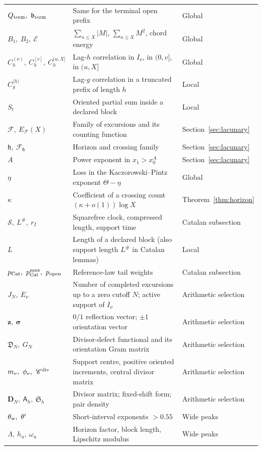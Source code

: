 \documentclass[11pt,reqno]{amsart}
\numberwithin{equation}{section}
\theoremstyle{plain}
\theoremstyle{definition}
\theoremstyle{remark}
\newcommand{\Sq}{\mathcal{S}}
\newcommand{\En}{\mathcal{E}}
\newcommand{\F}{\mathcal{F}}
\begin{document}
\begin{longtable}{@{}p{}p{}p{}@{}}
$Q_{\rm term},\ \mathfrak b_{\rm term}$ & Same for the terminal open prefix & Global\\
$B_1,\ B_2,\ \En$ & $\sum_{n\le X}|M|$, $\sum_{n\le X}M^2$, chord energy & Global\\
$C_h^{(\nu)},\ C_h^{[v]},\ C_h^{(u,X]}$ & Lag-$h$ correlation in $I_\nu$, in $(0,v]$, in $(u,X]$ & Global\\
$C_g^{\langle h\rangle}$ & Lag-$g$ correlation in a truncated prefix of length $h$ & Local\\
$S_t$ & Oriented partial sum inside a declared block & Local\\
$\F,\ E_\F(X)$ & Family of excursions and its counting function & Section~\ref{sec:lacunary}\\
$\mathfrak h,\ \F_{\mathfrak h}$ & Horizon and crossing family & Section~\ref{sec:lacunary}\\
$A$ & Power exponent in $x_1>x_0^A$ & Section~\ref{sec:lacunary}\\
$\eta$ & Loss in the Kaczorowski--Pintz exponent $\Theta-\eta$ & Global\\
$\kappa$ & Coefficient of a crossing count $(\kappa+o(1))\log X$ & Theorem~\ref{thm:horizon}\\
$\Sq,\ L^\#,\ r_I$ & Squarefree clock, compressed length, support time & Catalan subsection\\
$L$ & Length of a declared block (also support length $L^\#$ in Catalan lemmas) & Local\\
$p_{\rm Cat},\ p^{\max}_{\rm Cat},\ p_{\rm open}$ & Reference-law tail weights & Catalan subsection\\
$J_N,\ E_\nu$ & Number of completed excursions up to a zero cutoff $N$; active support of $I_\nu$ & Arithmetic selection\\
$\mathbf z,\ \boldsymbol\sigma$ & $0/1$ reflection vector; $\pm1$ orientation vector & Arithmetic selection\\
$\mathfrak D_N,\ G_N$ & Divisor-defect functional and its orientation Gram matrix & Arithmetic selection\\
$m_\nu,\ \phi_\nu,\ \mathscr C^{\rm div}$ & Support centre, positive oriented increments, central divisor matrix & Arithmetic selection\\
$\mathbf D_N,\ \mathsf A_h,\ \mathfrak S_h$ & Divisor matrix; fixed-shift form; pair density & Arithmetic selection\\
$\theta_{\rm w},\ \theta'$ & Short-interval exponents $>0.55$ & Wide peaks\\
$\Lambda,\ h_u,\ \omega_u$ & Horizon factor, block length, Lipschitz modulus & Wide peaks\\

\end{longtable}
\end{document}

